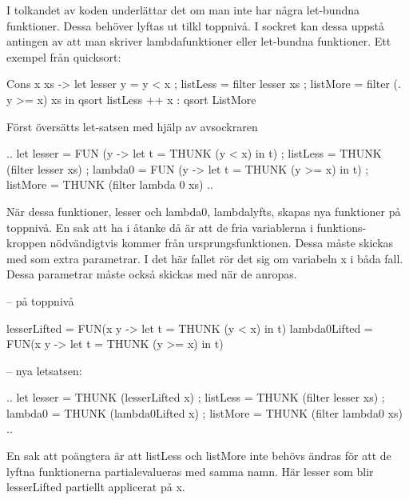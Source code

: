 \documentclass[../Core]{subfiles}
\begin{document}
I tolkandet av koden underlättar det om man inte har några let-bundna funktioner.
Dessa behöver lyftas ut tilkl toppnivå. I sockret kan dessa uppstå antingen
av att man skriver lambdafunktioner eller let-bundna funktioner. Ett exempel
från quicksort:

\begin{codeEx}
  Cons x xs ->
      let { lesser y = y < x
          ; listLess = filter lesser xs
          ; listMore = filter (\y . y >= x) xs
          }
      in  qsort listLess ++ x : qsort ListMore
\end{codeEx}

Först översätts let-satsen med hjälp av avsockraren

\begin{codeEx}
  .. let { lesser = FUN (y -> let t = THUNK (y < x) in t)
         ; listLess = THUNK (filter lesser xs)
         ; lambda0 = FUN (y -> let t = THUNK (y >= x) in t)
         ; listMore = THUNK (filter lambda 0 xs)
         } ..
\end{codeEx}
      
När dessa funktioner, lesser och lambda0, lambdalyfts, skapas nya funktioner
på toppnivå. En sak att ha i åtanke då är att de fria variablerna i funktions-
kroppen nödvändigtvis kommer från ursprungsfunktionen. Dessa måste skickas med
som extra parametrar. I det här fallet rör det sig om variabeln x i båda fall.
Dessa parametrar måste också skickas med när de anropas.

-- på toppnivå
\begin{codeEx}
lesserLifted = FUN(x y -> let t = THUNK (y < x) in t)
lambda0Lifted = FUN(x y -> let t = THUNK (y >= x) in t)
\end{codeEx}

-- nya letsatsen:
\begin{codeEx}
    .. let { lesser = THUNK (lesserLifted x)
           ; listLess = THUNK (filter lesser xs)
           ; lambda0 = THUNK (lambda0Lifted x)
           ; listMore = THUNK (filter lambda0 xs)
           } ..
\end{codeEx}

En sak att poängtera är att listLess och listMore inte behövs ändras för
att de lyftna funktionerna partialevalueras med samma namn. Här lesser som
blir lesserLifted partiellt applicerat på x.
\end{document}
